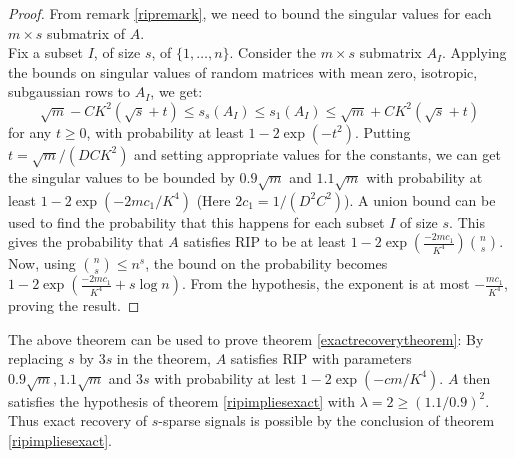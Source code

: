 \begin{proof}
	From remark \ref{ripremark}, we need to bound the singular values
	for each $m\times s$ submatrix of $A$.\\
	Fix a subset $I$, of size $s$, of $\{1,\ldots, n\}$.
	Consider the $m\times s$ submatrix $A_I$.
	Applying the bounds on singular values of random matrices with
	mean zero, isotropic, subgaussian rows to $A_I$, we get:
	\begin{equation*}
		\sqrt{m} - CK^2(\sqrt{s}+t)\leq s_s(A_I)\leq s_1(A_I)
			\leq \sqrt{m} + CK^2(\sqrt{s}+t)
	\end{equation*}
	for any $t\geq 0$, with probability at least $1-2\exp(-t^2)$.
	Putting $t = \sqrt{m}/(DCK^2)$ and setting appropriate values
	for the constants, we can get the singular values to be
	bounded by $0.9\sqrt{m}$ and $1.1\sqrt{m}$ with probability
	at least $1-2\exp(-2mc_1/K^4)$ (Here $2c_1 = 1/(D^2C^2)$).
	A union bound can be used to find the probability that
	this happens for each subset $I$ of size $s$. This gives
	the probability that $A$ satisfies RIP to be at least
	$1-2\exp(\frac{-2mc_1}{K^4})\binom{n}{s}$. Now, using
	$\binom{n}{s}\leq n^s$, the bound on the probability becomes
	$1-2\exp(\frac{-2mc_1}{K^4}+s\log n)$. From the hypothesis,
	the exponent is at most $-\frac{mc_1}{K^4}$, proving the result.
\end{proof}

\begin{remark}
	The above theorem can be used to prove theorem
	\ref{exactrecoverytheorem}: By replacing $s$ by $3s$
	in the theorem, $A$ satisfies RIP with parameters
	$0.9\sqrt{m}, 1.1\sqrt{m}$ and $3s$ with probability
	at lest $1-2\exp(-cm/K^4)$. 
	$A$ then satisfies the hypothesis of theorem
	\ref{ripimpliesexact} with $\lambda = 2\geq (1.1/0.9)^2$.
	Thus exact recovery of $s$-sparse signals is possible by
	the conclusion of theorem \ref{ripimpliesexact}.
\end{remark}
